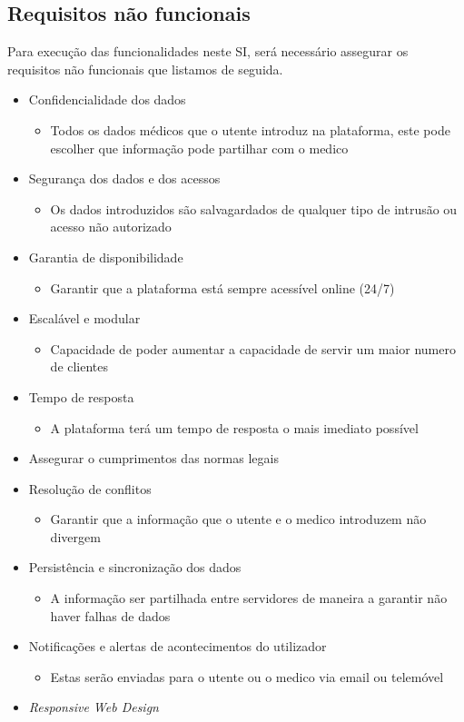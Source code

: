 \documentclass[12pt, a4paper, twoside]{report} %
\begin{document}

\subsection{Requisitos não funcionais}

Para execução das funcionalidades neste SI, será necessário assegurar os requisitos não funcionais que listamos de seguida.

\begin{itemize}
\item Confidencialidade dos dados
\begin{itemize}
\item Todos os dados médicos que o utente introduz na plataforma, este pode escolher que informação pode partilhar com o medico
\end{itemize}
\item Segurança dos dados e dos acessos
\begin{itemize}
\item Os dados introduzidos são salvagardados de qualquer tipo de intrusão ou acesso não autorizado
\end{itemize}
\item Garantia de disponibilidade
\begin{itemize}
\item Garantir que a plataforma está sempre acessível online (24/7)
\end{itemize}
\item Escalável e modular
\begin{itemize}
\item Capacidade de poder aumentar a capacidade de servir um maior numero de clientes
\end{itemize}
\item Tempo de resposta
\begin{itemize}
\item A plataforma terá um tempo de resposta o mais imediato possível
\end{itemize}
\item Assegurar o cumprimentos das normas legais
\item Resolução de conflitos
\begin{itemize}
\item Garantir que a informação que o utente e o medico introduzem não divergem
\end{itemize}
\item Persistência e sincronização dos dados
\begin{itemize}
\item A informação ser partilhada entre servidores de maneira a garantir não haver falhas de dados
\end{itemize}
\item Notificações e alertas de acontecimentos do utilizador
\begin{itemize}
\item Estas serão enviadas para o utente ou o medico via email ou telemóvel
\end{itemize}
\item \textit {Responsive Web Design}
\end{itemize}
\end{document}
